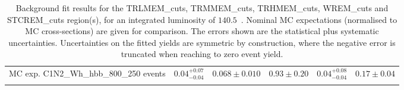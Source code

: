\begin{table}
\begin{center}
{\begin{tabular*}{\textwidth}{@{\extracolsep{\fill}}lrrrrr}
        MC exp. C1N2\_Wh\_hbb\_800\_250 events         & $0.04_{-0.04}^{+0.07}$          & $0.068 \pm 0.010$          & $0.93 \pm 0.20$          & $0.04_{-0.04}^{+0.08}$          & $0.17 \pm 0.04$              \\
\noalign{\smallskip}\hline\noalign{\smallskip}
\end{tabular*}
}
\end{center}
\caption{ Background fit results for the TRLMEM\_cuts, TRMMEM\_cuts, TRHMEM\_cuts, WREM\_cuts and STCREM\_cuts region(s),  for an integrated luminosity of $140.5$~\ifb.
Nominal MC expectations (normalised to MC cross-sections) are given for comparison. 
The errors shown are the statistical plus systematic uncertainties.
Uncertainties on the fitted yields are symmetric by construction, 
where the negative error is truncated when reaching to zero event yield.
}
\label{table.results.yields.fit.CR}
\end{table}
%